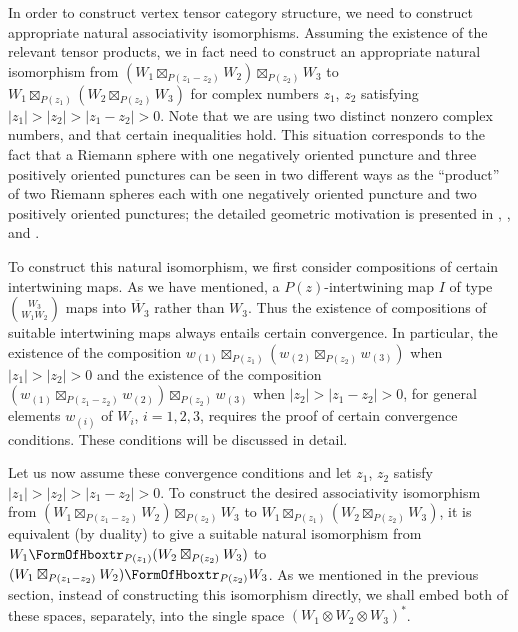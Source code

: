 \documentclass[12pt]{article}
\begin{document}
In order to construct vertex tensor category structure, we need to
construct appropriate natural associativity isomorphisms.  Assuming
the existence of the relevant tensor products, we in fact need to
construct an appropriate natural isomorphism {}from $(W_1
\boxtimes_{P(z_1-z_2)} W_2)\boxtimes_{P(z_2)} W_3$ to
$W_1\boxtimes_{P(z_1)} (W_2\boxtimes_{P(z_2)} W_3)$ for complex
numbers $z_1$, $z_2$ satisfying $|z_1|>|z_2|>|z_1-z_2|>0$.  Note that
we are using two distinct nonzero complex numbers, and that certain
inequalities hold.  This situation corresponds to the fact that a
Riemann sphere with one negatively oriented puncture and three
positively oriented punctures can be seen in two different ways as the
``product'' of two Riemann spheres each with one negatively oriented
puncture and two positively oriented punctures; the detailed geometric
motivation is presented in \cite{H0}, \cite{H1}, \cite{tensorK} and
\cite{tensor4}.

To construct this natural isomorphism, we first consider compositions
of certain intertwining maps.  As we have mentioned, a
$P(z)$-intertwining map $I$ of type ${W_3 \choose {W_1 W_2}}$ maps
into $\overline{W}_3$ rather than $W_3$.  Thus the existence of
compositions of suitable intertwining maps always entails certain
convergence.  In particular, the existence of the composition
$w_{(1)}\boxtimes_{P(z_1)} (w_{(2)}\boxtimes_{P(z_2)} w_{(3)})$ when
$|z_1|>|z_2|>0$ and the existence of the composition
$(w_{(1)}\boxtimes_{P(z_1-z_2)} w_{(2)})\boxtimes_{P(z_2)} w_{(3)}$
when $|z_2|>|z_1-z_2|>0$, for general elements $w_{(i)}$ of $W_i$,
$i=1,2,3$, requires the proof of certain convergence conditions.
These conditions will be discussed in detail.

Let us now assume these convergence conditions and let $z_1$, $z_2$
satisfy $|z_1|>|z_2|>|z_1-z_2|>0$. To construct the desired
associativity isomorphism {}from $(W_1 \boxtimes_{P(z_1-z_2)}
W_2)\boxtimes_{P(z_2)} W_3$ to $W_1\boxtimes_{P(z_1)}
(W_2\boxtimes_{P(z_2)} W_3)$, it is equivalent (by duality) to give a
suitable natural isomorphism {}from $W_1\hboxtr_{P(z_1)}
(W_2\boxtimes_{P(z_2)} W_3)$ to $(W_1 \boxtimes_{P(z_1-z_2)}
W_2)\hboxtr_{P(z_2)} W_3$. As we mentioned in the previous section,
instead of constructing this isomorphism directly, we shall embed both
of these spaces, separately, into the single space $(W_1\otimes W_2
\otimes W_3)^*$.
\end{document}
